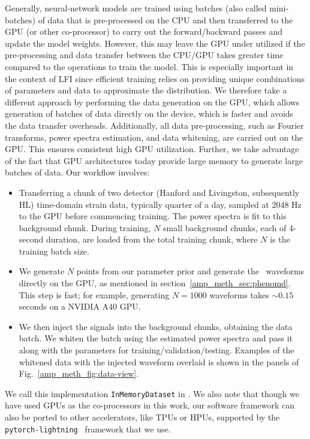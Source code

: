 \begin{refsection}
Generally, neural-network models are trained using batches (also called mini-batches) of data that is pre-processed on the CPU and then transferred to the GPU (or other co-processor) to carry out the forward/backward passes and update the model weights.
However, this may leave the GPU under utilized if the pre-processing and data transfer between the CPU/GPU takes greater time compared to the operations to train the model.
This is especially important in the context of LFI since efficient training relies on providing unique combinations of parameters and data to approximate the distribution. 
We therefore take a different approach by performing the data generation on the GPU, which allows generation of batches of data directly on the device, which is faster and avoids the data transfer overheads. 
Additionally, all data pre-processing, such as Fourier transforms, power spectra estimation, and data whitening, are carried out on the GPU. 
This ensures consistent high GPU utilization. 
Further, we take advantage of the fact that GPU architectures today provide large memory to generate large batches of data. 
Our workflow involves:
\begin{itemize}
    \item Transferring a chunk of two detector (Hanford and Livingston, subsequently HL) time-domain strain data, typically quarter of a day, sampled at 2048 Hz to the GPU before commencing training. 
    The power spectra is fit to this background chunk.
    During training, $N$ small background chunks, each of 4-second duration, are loaded from the total training chunk, where $N$ is the training batch size.
    \item We generate $N$ points from our parameter prior and generate the \phenomd~waveforms directly on the GPU, as mentioned in section~\ref{amp_meth_sec:phenomd}. 
    This step is fast; for example, generating $N=1000$ waveforms takes $\sim 0.15$ seconds on a NVIDIA A40 GPU. 
    \item We then inject the signals into the background chunks, obtaining the data batch. 
    We whiten the batch using the estimated power spectra and pass it along with the parameters for training/validation/testing. 
    Examples of the whitened data with the injected waveform overlaid is shown in the panels of Fig.~\ref{amp_meth_fig:data-view}.
\end{itemize}
We call this implementation {\tt InMemoryDataset} in \mlgw. 
We also note that though we have used GPUs as the co-processors in this work, our software framework can also be ported to other accelerators, like TPUs or HPUs, supported by the {\tt{pytorch-lightning}}~\cite{falcon_2024_10779019} framework that we use.


\end{refsection}

